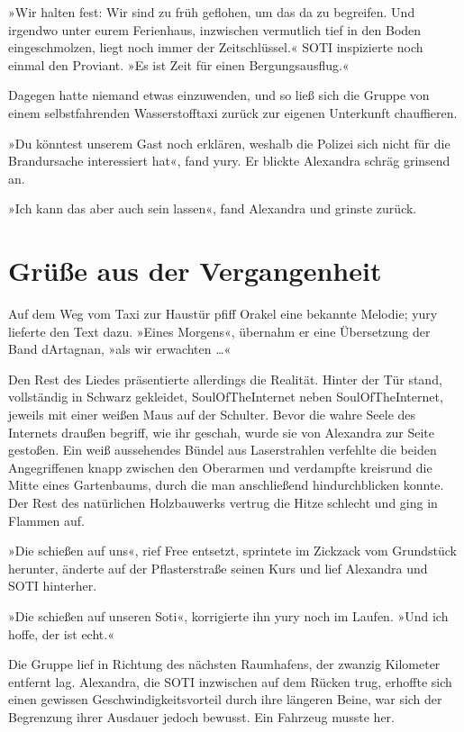 »Wir halten fest: Wir sind zu früh geflohen, um das da zu begreifen. Und irgendwo unter eurem Ferienhaus, inzwischen vermutlich tief in den Boden eingeschmolzen, liegt noch immer der Zeitschlüssel.« SOTI inspizierte noch einmal den Proviant. »Es ist Zeit für einen Bergungsausflug.«

Dagegen hatte niemand etwas einzuwenden, und so ließ sich die Gruppe von einem selbstfahrenden Wasserstofftaxi zurück zur eigenen Unterkunft chauffieren.

»Du könntest unserem Gast noch erklären, weshalb die Polizei sich nicht für die Brandursache interessiert hat«, fand yury. Er blickte Alexandra schräg grinsend an.

»Ich kann das aber auch sein lassen«, fand Alexandra und grinste zurück.


\chapter{Grüße aus der Vergangenheit}

Auf dem Weg vom Taxi zur Haustür pfiff Orakel eine bekannte Melodie; yury lieferte den Text dazu. »Eines Morgens«, übernahm er eine Übersetzung der Band dArtagnan, »als wir erwachten …«

Den Rest des Liedes präsentierte allerdings die Realität. Hinter der Tür stand, vollständig in Schwarz gekleidet, SoulOfTheInternet neben SoulOfTheInternet, jeweils mit einer weißen Maus auf der Schulter. Bevor die wahre Seele des Internets draußen begriff, wie ihr geschah, wurde sie von Alexandra zur Seite gestoßen. Ein weiß aussehendes Bündel aus Laserstrahlen verfehlte die beiden Angegriffenen knapp zwischen den Oberarmen und verdampfte kreisrund die Mitte eines Gartenbaums, durch die man anschließend hindurchblicken konnte. Der Rest des natürlichen Holzbauwerks vertrug die Hitze schlecht und ging in Flammen auf.

»Die schießen auf uns«, rief Free entsetzt, sprintete im Zickzack vom Grundstück herunter, änderte auf der Pflasterstraße seinen Kurs und lief Alexandra und SOTI hinterher.

»Die schießen auf unseren Soti«, korrigierte ihn yury noch im Laufen. »Und ich hoffe, der ist echt.«

Die Gruppe lief in Richtung des nächsten Raumhafens, der zwanzig Kilometer entfernt lag. Alexandra, die SOTI inzwischen auf dem Rücken trug, erhoffte sich einen gewissen Geschwindigkeitsvorteil durch ihre längeren Beine, war sich der Begrenzung ihrer Ausdauer jedoch bewusst. Ein Fahrzeug musste her.

